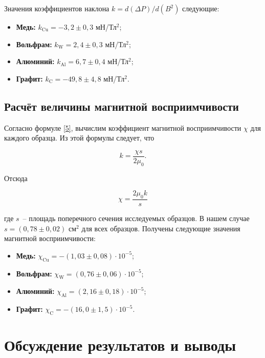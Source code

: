 \documentclass[a4paper,12pt]{article} %
\begin{document}
Значения коэффициентов наклона $k = d(\Delta P)/d(B^2)$ следующие:

\begin{itemize}
    \item \textbf{Медь:} $k_\text{Cu} = -3,2 \pm 0,3$ мН/Тл$^2$;
    \item \textbf{Вольфрам:} $k_\text{W} = 2,4 \pm 0,3$ мН/Тл$^2$;
    \item \textbf{Алюминий:} $k_\text{Al} = 6,7 \pm 0,4$ мН/Тл$^2$;
    \item \textbf{Графит:} $k_\text{C} = -49,8 \pm 4,8$ мН/Тл$^2$.
\end{itemize}

\subsection{Расчёт величины магнитной восприимчивости}

Согласно формуле \eqref{5}, вычислим коэффициент магнитной восприимчивости $\chi$ для каждого образца. Из этой формулы следует, что

\begin{equation}\label{6}
    k = \frac{\chi s}{2\mu_0}.
\end{equation}

Отсюда

\begin{equation}\label{7}
    \chi = \frac{2\mu_0 k}{s}
\end{equation}

где $ s $~-- площадь поперечного сечения исследуемых образцов. В нашем случае $ s = (0,78 \pm 0,02) $ см$^2 $ для всех образцов. Получены следующие значения магнитной восприимчивости:

\begin{itemize}
    \item \textbf{Медь:} $\chi_\text{Cu} = -(1,03 \pm 0,08)\cdot 10^{-5}$;
    \item \textbf{Вольфрам:} $\chi_\text{W} = (0,76 \pm 0,06)\cdot 10^{-5}$;
    \item \textbf{Алюминий:} $\chi_\text{Al} = (2,16 \pm 0,18)\cdot 10^{-5}$;
    \item \textbf{Графит:} $\chi_\text{C} = -(16,0 \pm 1,5)\cdot 10^{-5}$.
\end{itemize}

\section{Обсуждение результатов и выводы}
\end{document}
